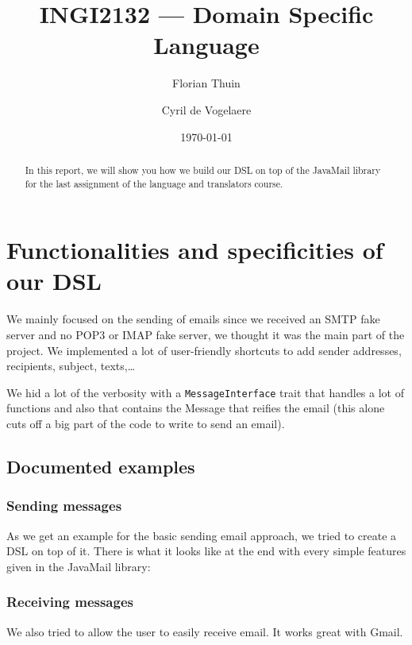 \documentclass[a4paper, 11pt]{article}
\author{Florian Thuin \and Cyril de Vogelaere}
\date{\today}
\title{INGI2132 --- Domain Specific Language}
\begin{document}
    \maketitle

    \begin{abstract}
        In this report, we will show you how we build our DSL on top of the
        JavaMail library for the last assignment of the language and translators
        course.
    \end{abstract}

    \section{Functionalities and specificities of our DSL}

    We mainly focused on the sending of emails since we received an SMTP fake
    server and no POP3 or IMAP fake server, we thought it was the main part
    of the project. We implemented a lot of user-friendly shortcuts to add
    sender addresses, recipients, subject, texts,\ldots

    We hid a lot of the verbosity with a \verb#MessageInterface# trait that
    handles a lot of functions and also that contains the Message that reifies
    the email (this alone cuts off a big part of the code to write to send
    an email).

    \subsection{Documented examples}
    \subsubsection{Sending messages}
    As we get an example for the basic sending email approach, we tried to
    create a DSL on top of it. There is what it looks like at the end with
    every simple features given in the JavaMail library:

    

    \subsubsection{Receiving messages}

    We also tried to allow the user to easily receive email. It works great
    with Gmail.

    
\end{document}
